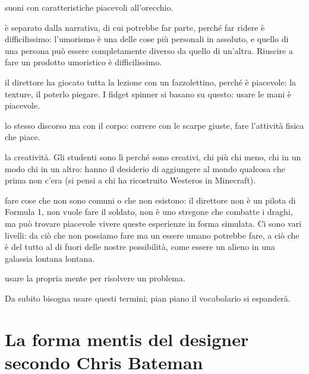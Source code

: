 \begin{description}
        suoni con caratteristiche piacevoli all'orecchio.
  \item[Humor (umorismo)] è separato dalla narrativa, di cui potrebbe far
        parte, perché far ridere è difficilissimo: l'umorismo è una delle cose
        più personali in assoluto, e quello di una persona può essere
        completamente diverso da quello di un'altra. Riuscire a fare un
        prodotto umoristico è difficilissimo.
  \item[Physical manipulation (manipolazione fisica)] il direttore ha giocato
        tutta la lezione con un fazzolettino, perché è piacevole: la texture,
        il poterlo piegare. I fidget spinner si basano su questo: usare le
        mani è piacevole.
  \item[Physicality (fisicità)] lo stesso discorso ma con il corpo: correre con
        le scarpe giuste, fare l'attività fisica che piace.
  \item[Creation (creazione)] la creatività. Gli studenti sono lì perché sono
        creativi, chi più chi meno, chi in un modo chi in un altro: hanno il
        desiderio di aggiungere al mondo qualcosa che prima non c'era (si
        pensi a chi ha ricostruito Westeros in Minecraft).
  \item[Vicarious experience (esperienza vicaria)] fare cose che non sono
        comuni o che non esistono: il direttore non è un pilota di Formula 1,
        non vuole fare il soldato, non è uno stregone che combatte i draghi, ma
        può trovare piacevole vivere queste esperienze in forma simulata. Ci
        sono vari livelli: da ciò che non possiamo fare ma un essere umano
        potrebbe fare, a ciò che è del tutto al di fuori delle nostre
        possibilità, come essere un alieno in una galassia lontana lontana.
  \item[Logic/Puzzle (logica, problem solving)] usare la propria mente per
        risolvere un problema.
\end{description}
Da subito bisogna usare questi termini; pian piano il vocabolario si
espanderà.

\section{La forma mentis del designer secondo Chris Bateman}
\label{sec:bateman}



